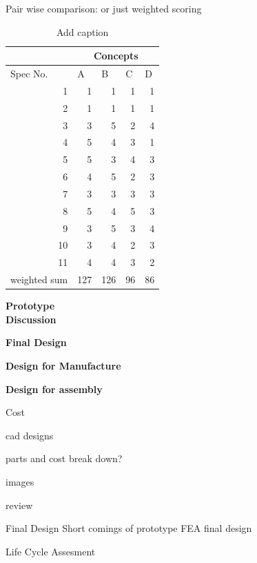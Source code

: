 Pair wise comparison: or just weighted scoring

\begin{table}[htbp]
  \centering
  \caption{Add caption}
    \begin{tabular}{lrrrr}
          & \multicolumn{4}{c}{Concepts} \\
\hline
    Spec No. & \multicolumn{1}{l}{A} & \multicolumn{1}{l}{B} & \multicolumn{1}{l}{C} & \multicolumn{1}{l}{D} \\
\hline
    \multicolumn{1}{r}{1} & 1     & 1     & 1     & 1 \\
    \multicolumn{1}{r}{2} & 1     & 1     & 1     & 1 \\
    \multicolumn{1}{r}{3} & 3     & 5     & 2     & 4 \\
    \multicolumn{1}{r}{4} & 5     & 4     & 3     & 1 \\
    \multicolumn{1}{r}{5} & 5     & 3     & 4     & 3 \\
    \multicolumn{1}{r}{6} & 4     & 5     & 2     & 3 \\
    \multicolumn{1}{r}{7} & 3     & 3     & 3     & 3 \\
    \multicolumn{1}{r}{8} & 5     & 4     & 5     & 3 \\
    \multicolumn{1}{r}{9} & 3     & 5     & 3     & 4 \\
    \multicolumn{1}{r}{10} & 3     & 4     & 2     & 3 \\
    \multicolumn{1}{r}{11} & 4     & 4     & 3     & 2 \\
    weighted sum & \cellcolor[rgb]{ .388,  .745,  .482}127 & \cellcolor[rgb]{ .427,  .757,  .486}126 & \cellcolor[rgb]{ .98,  .616,  .459}96 & \cellcolor[rgb]{ .973,  .412,  .42}86 \\
\hline
    \end{tabular}%
  \label{tab:addlabel}%
\end{table}%





\textbf{Prototype}\\



\textbf{Discussion}



\textbf{Final Design}



\textbf{Design for Manufacture}

\textbf{Design for assembly}

Cost



cad designs

parts and cost break down?

images

review


Final Design
Short comings of prototype FEA
final design


Life Cycle Assesment